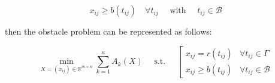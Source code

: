 \begin{equation}
x_{i j} \geq b\left(t_{i j}\right) \quad \forall t_{i j} \quad \text { with } \quad t_{i j} \in \mathcal{B}
\end{equation}

then the obstacle problem can be represented as follows:

\begin{equation}
\min _{X=\left(x_{i j}\right) \in \mathbb{R}^{m \times n}} \sum_{k=1}^{\kappa} A_{k}(X) \quad \text { s.t. } \quad\left[\begin{array}{ll}
x_{i j}=r\left(t_{i j}\right) & \forall t_{i j} \in \Gamma \\
x_{i j} \geq b\left(t_{i j}\right) & \forall t_{i j} \in \mathcal{B}
\end{array}\right.
\end{equation}


